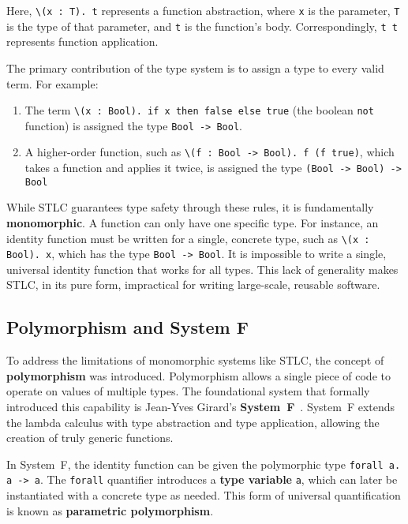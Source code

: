 Here, \texttt{\textbackslash(x : T). t} represents a function abstraction, where \texttt{x} is the parameter, \texttt{T} is the type of that parameter, and \texttt{t} is the function's body. Correspondingly, \texttt{t t} represents function application.

The primary contribution of the type system is to assign a type to every valid term. For example:

\begin{enumerate}
    \item The term \texttt{\textbackslash(x : Bool). if x then false else true} (the boolean \texttt{not} function) is assigned the type \texttt{Bool -> Bool}.

    \item A higher-order function, such as \texttt{\textbackslash(f : Bool -> Bool). f (f true)}, which takes a function and applies it twice, is assigned the type \texttt{(Bool -> Bool) -> Bool}
\end{enumerate}

While STLC guarantees type safety through these rules, it is fundamentally \textbf{monomorphic}. A function can only have one specific type. For instance, an identity function must be written for a single, concrete type, such as \texttt{\textbackslash(x : Bool). x}, which has the type \texttt{Bool -> Bool}. It is impossible to write a single, universal identity function that works for all types. This lack of generality makes STLC, in its pure form, impractical for writing large-scale, reusable software.

\subsection{Polymorphism and System F}
\label{chap:LiteratureReview:sec:PolymorphismAndSystemF}

To address the limitations of monomorphic systems like STLC, the concept of \textbf{polymorphism} was introduced. Polymorphism allows a single piece of code to operate on values of multiple types. The foundational system that formally introduced this capability is Jean-Yves Girard's \textbf{System~F}~\cite{girard-system-f}. System~F extends the lambda calculus with type abstraction and type application, allowing the creation of truly generic functions.

In System~F, the identity function can be given the polymorphic type \texttt{forall a. a -> a}. The \texttt{forall} quantifier introduces a \textbf{type variable} \texttt{a}, which can later be instantiated with a concrete type as needed. This form of universal quantification is known as \textbf{parametric polymorphism}.

